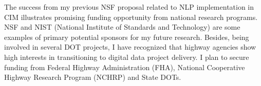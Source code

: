 \documentclass[a4paper,11pt]{article}
\begin{document}
%
The success from my previous NSF proposal related to NLP implementation in CIM illustrates promising funding opportunity from national research programs. NSF and NIST (National Institute of Standards and Technology) are some examples of primary potential sponsors for my future research. Besides, being involved in several DOT projects, I have recognized that highway agencies show high interests in transitioning to digital data project delivery. I plan to secure funding from Federal Highway Administration (FHA), National Cooperative Highway Research Program (NCHRP) and State DOTs.
%
\end{document}
